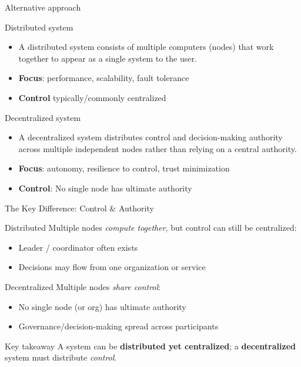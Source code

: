 \begin{frame}{Alternative approach}
  \begin{block}{Distributed system}
    \begin{itemize}
      \item A distributed system consists of multiple computers
            (nodes) that work together to appear as a single system to
            the user.
      \item \textbf{Focus}: performance, scalability, fault tolerance
      \item \textbf{Control} typically/commonly centralized
    \end{itemize}
  \end{block}
  \begin{block}{Decentralized system}
    \begin{itemize}
      \item A decentralized system distributes control and
            decision-making authority across multiple independent
            nodes rather than relying on a central authority.
      \item \textbf{Focus}: autonomy, resilience to control, trust minimization
      \item \textbf{Control}: No single node has ultimate authority
    \end{itemize}
  \end{block}
\end{frame}

\begin{frame}{The Key Difference: Control \& Authority}
  \begin{block}{Distributed}
    Multiple nodes \emph{compute together}, but control can still be centralized:
    \begin{itemize}
      \item Leader / coordinator often exists
      \item Decisions may flow from one organization or service
    \end{itemize}
  \end{block}

  \begin{block}{Decentralized}
    Multiple nodes \emph{share control}:
    \begin{itemize}
      \item No single node (or org) has ultimate authority
      \item Governance/decision-making spread across participants
    \end{itemize}
  \end{block}

  \begin{alertblock}{Key takeaway}
    A system can be \textbf{distributed yet centralized}; a \textbf{decentralized} system must distribute \emph{control}.
  \end{alertblock}
\end{frame}

